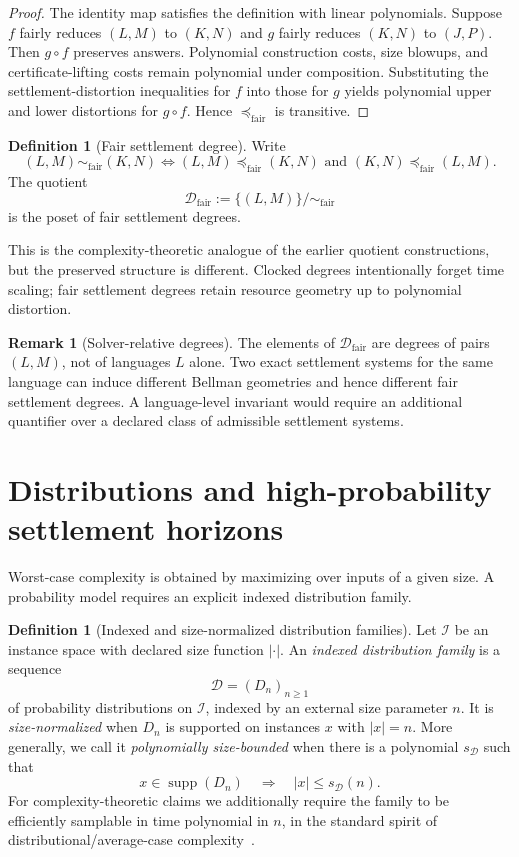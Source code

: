 \documentclass[11pt]{article}
\theoremstyle{definition}
\newtheorem{definition}[theorem]{Definition}
\newtheorem{remark}[theorem]{Remark}
\newcommand{\preFair}{\preceq_{\mathrm{fair}}}
\newcommand{\simFair}{\sim_{\mathrm{fair}}}
\newcommand{\Dfair}{\mathcal{D}_{\mathrm{fair}}}
\begin{document}
\begin{proof}
The identity map satisfies the definition with linear polynomials. Suppose $f$ fairly reduces $(L,M)$ to $(K,N)$ and $g$ fairly reduces $(K,N)$ to $(J,P)$. Then $g\circ f$ preserves answers. Polynomial construction costs, size blowups, and certificate-lifting costs remain polynomial under composition. Substituting the settlement-distortion inequalities for $f$ into those for $g$ yields polynomial upper and lower distortions for $g\circ f$. Hence $\preFair$ is transitive.
\end{proof}

\begin{definition}[Fair settlement degree]
Write
\[
(L,M)\simFair(K,N)
\Longleftrightarrow
(L,M)\preFair(K,N)\text{ and }(K,N)\preFair(L,M).
\]
The quotient
\[
\Dfair:=\{(L,M)\}/\!\simFair
\]
is the poset of fair settlement degrees.
\end{definition}

This is the complexity-theoretic analogue of the earlier quotient constructions, but the preserved structure is different. Clocked degrees intentionally forget time scaling; fair settlement degrees retain resource geometry up to polynomial distortion.

\begin{remark}[Solver-relative degrees]
The elements of $\Dfair$ are degrees of pairs $(L,M)$, not of languages $L$ alone. Two exact settlement systems for the same language can induce different Bellman geometries and hence different fair settlement degrees. A language-level invariant would require an additional quantifier over a declared class of admissible settlement systems.
\end{remark}

\section{Distributions and high-probability settlement horizons}
Worst-case complexity is obtained by maximizing over inputs of a given size. A probability model requires an explicit indexed distribution family.

\begin{definition}[Indexed and size-normalized distribution families]\label{def:indexed-distribution}
Let $\mathcal I$ be an instance space with declared size function $|\cdot|$. An \emph{indexed distribution family} is a sequence
\[
\mathcal D=(D_n)_{n\ge1}
\]
of probability distributions on $\mathcal I$, indexed by an external size parameter $n$. It is \emph{size-normalized} when $D_n$ is supported on instances $x$ with $|x|=n$. More generally, we call it \emph{polynomially size-bounded} when there is a polynomial $s_{\mathcal D}$ such that
\[
x\in\operatorname{supp}(D_n)\quad\Longrightarrow\quad |x|\le s_{\mathcal D}(n).
\]
For complexity-theoretic claims we additionally require the family to be efficiently samplable in time polynomial in $n$, in the standard spirit of distributional/average-case complexity~\cite{Levin1986,BogdanovTrevisan2006}.
\end{definition}
\end{document}
